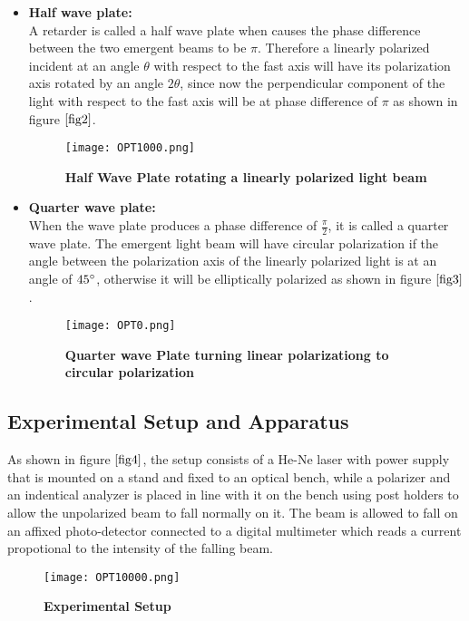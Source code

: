 		\begin{itemize}
			\item \textbf{Half wave plate:}\\
			A retarder is called a half wave plate when causes the phase difference between the two emergent beams to be $\pi$. Therefore a linearly polarized incident at an angle $\theta$ with respect to the fast axis will have its polarization axis rotated by an angle $2\theta$, since now the perpendicular component of the light with respect to the fast axis will be at phase difference of $\pi$ as shown in figure  $\ref{fig2}$.
			\begin{figure}[H]
				\texttt{[image: OPT1000.png]}
				\caption{\textbf{Half Wave Plate rotating a linearly polarized light beam}}
				\label{fig2}
			\end{figure} 

			\item \textbf{Quarter wave plate:}\\
			When the wave plate produces a phase difference of $\frac{\pi}{2}$, it is called a quarter wave plate. The emergent light beam will have circular polarization if the angle between the polarization axis of the linearly polarized light is at an angle of $45\degree$, otherwise it will be elliptically polarized as shown in figure $\ref{fig3}$.
			\begin{figure}[H]
				\texttt{[image: OPT0.png]}
				\caption{\textbf{Quarter wave Plate turning linear polarizationg to circular polarization}}
				\label{fig3}
			\end{figure}
		\end{itemize}

	\subsection{Experimental Setup and Apparatus}
		As shown in figure $\ref{fig4}$, the setup consists of a He-Ne laser with power supply that is mounted on a stand and fixed to an optical bench, while a polarizer and an indentical analyzer is placed in line with it on the bench using post holders to allow the unpolarized beam to fall normally on it. The beam is allowed to fall on an affixed photo-detector connected to a digital multimeter which reads a current propotional to the intensity of the falling beam.

		\begin{figure}[H]
			\texttt{[image: OPT10000.png]}
			\caption{\textbf{Experimental Setup}}
			\label{fig4}
		\end{figure}
	
